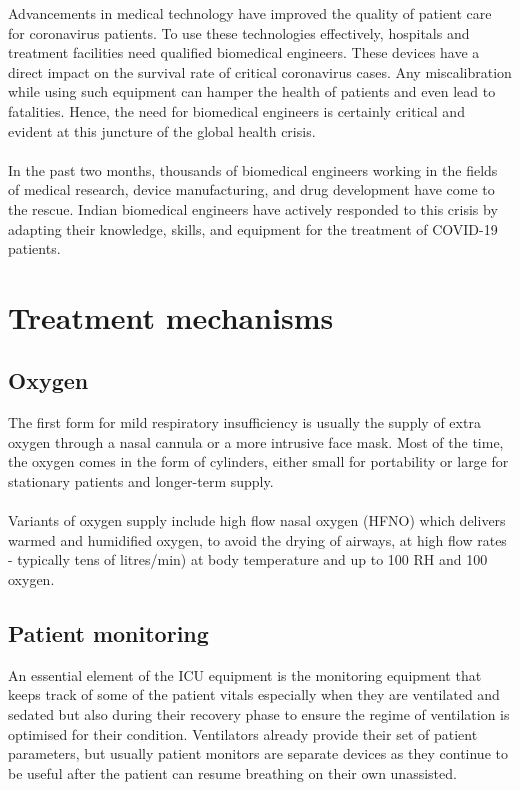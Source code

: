 \documentclass[12pt]{article}
\begin{document}
Advancements in medical technology have improved the quality of patient care for coronavirus patients. To use these technologies effectively, hospitals and treatment facilities need qualified biomedical engineers. These devices have a direct impact on the survival rate of critical coronavirus cases. Any miscalibration while using such equipment can hamper the health of patients and even lead to fatalities. Hence, the need for biomedical engineers is certainly critical and evident at this juncture of the global health crisis.
\\\\
In the past two months, thousands of biomedical engineers working in the fields of medical research, device manufacturing, and drug development have come to the rescue. Indian biomedical engineers have actively responded to this crisis by adapting their knowledge, skills, and equipment for the treatment of COVID-19 patients.





\section*{Treatment mechanisms}

\subsection{Oxygen}

The first form for mild respiratory insufficiency is usually the supply of extra oxygen through a nasal cannula or a more intrusive face mask. Most of the time, the oxygen comes in the form of cylinders, either small for portability or large for stationary patients and longer-term supply.
\\
\\
Variants of oxygen supply include high flow nasal oxygen (HFNO) which delivers warmed and humidified oxygen, to avoid the drying of airways, at high flow rates - typically tens of litres/min) at body temperature and up to 100 RH and 100 oxygen.







\subsection{Patient monitoring}


An essential element of the ICU equipment is the monitoring equipment that keeps track of some of the patient vitals especially when they are ventilated and sedated but also during their recovery phase to ensure the regime of ventilation is optimised for their condition. Ventilators already provide their set of patient parameters, but usually patient monitors are separate devices as they continue to be useful after the patient can resume breathing on their own unassisted.
\end{document}
